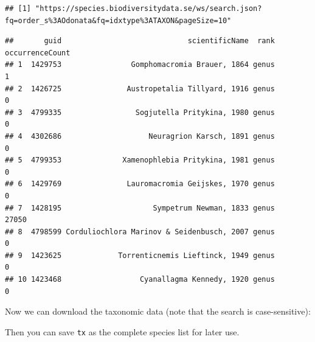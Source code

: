 \documentclass[
  10pt,
]{article}
\newenvironment{Shaded}{\begin{snugshade}}{\end{snugshade}}
\newcommand{\AttributeTok}[1]{\textcolor[rgb]{0.77,0.63,0.00}{#1}}
\newcommand{\ConstantTok}[1]{\textcolor[rgb]{0.00,0.00,0.00}{#1}}
\newcommand{\DocumentationTok}[1]{\textcolor[rgb]{0.56,0.35,0.01}{\textbf{\textit{#1}}}}
\newcommand{\FunctionTok}[1]{\textcolor[rgb]{0.00,0.00,0.00}{#1}}
\newcommand{\NormalTok}[1]{#1}
\newcommand{\OtherTok}[1]{\textcolor[rgb]{0.56,0.35,0.01}{#1}}
\newcommand{\SpecialCharTok}[1]{\textcolor[rgb]{0.00,0.00,0.00}{#1}}
\newcommand{\StringTok}[1]{\textcolor[rgb]{0.31,0.60,0.02}{#1}}
\begin{document}
\begin{verbatim}
## [1] "https://species.biodiversitydata.se/ws/search.json?fq=order_s%3AOdonata&fq=idxtype%3ATAXON&pageSize=10"
\end{verbatim}

\begin{verbatim}
##       guid                             scientificName  rank occurrenceCount
## 1  1429753                Gomphomacromia Brauer, 1864 genus               1
## 2  1426725               Austropetalia Tillyard, 1916 genus               0
## 3  4799335                 Sogjutella Pritykina, 1980 genus               0
## 4  4302686                    Neuragrion Karsch, 1891 genus               0
## 5  4799353              Xamenophlebia Pritykina, 1981 genus               0
## 6  1429769               Lauromacromia Geijskes, 1970 genus               0
## 7  1428195                     Sympetrum Newman, 1833 genus           27050
## 8  4798599 Corduliochlora Marinov & Seidenbusch, 2007 genus               0
## 9  1423625             Torrenticnemis Lieftinck, 1949 genus               0
## 10 1423468                  Cyanallagma Kennedy, 1920 genus               0
\end{verbatim}

Now we can download the taxonomic data (note that the search is case-sensitive):

\begin{Shaded}
\end{Shaded}

Then you can save \texttt{tx} as the complete species list for later use.
\end{document}
